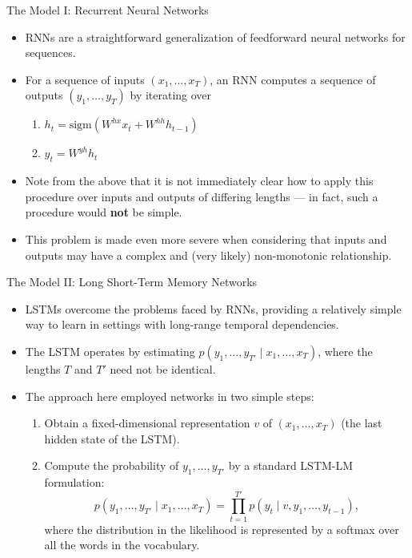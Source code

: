\documentclass{beamer}
\begin{document}

\begin{frame}{The Model I: Recurrent Neural Networks}

\begin{itemize}
  \itemsep10pt
  \item RNNs are a straightforward generalization of feedforward neural networks
    for sequences.
  \item For a sequence of inputs $(x_1, \dots, x_T)$, an RNN computes a sequence
    of outputs $(y_1, \dots, y_T)$ by iterating over
    \begin{enumerate}
      \item $h_t = \text{sigm}(W^{hx}x_t + W^{hh}h_{t-1})$
      \item $y_t = W^{yh}h_t$
    \end{enumerate}
  \item Note from the above that it is not immediately clear how to apply this
    procedure over inputs and outputs of differing lengths --- in fact, such a
    procedure would \textbf{not} be simple.
  \item This problem is made even more severe when considering that inputs and
    outputs may have a complex and (very likely) non-monotonic relationship.
\end{itemize}

\end{frame}


\begin{frame}{The Model II: Long Short-Term Memory Networks}

\begin{itemize}
  \itemsep10pt
  \item LSTMs overcome the problems faced by RNNs, providing a relatively simple
    way to learn in settings with long-range temporal dependencies.
  \item The LSTM operates by estimating $p(y_1, \dots, y_{T'} \mid x_1, \dots,
    x_T)$, where the lengths $T$ and $T'$ need not be identical.
  \item The approach here employed networks in two simple steps:
    \begin{enumerate}
      \item Obtain a fixed-dimensional representation $v$ of $(x_1, \dots, x_T)$
        (the last hidden state of the LSTM).
      \item Compute the probability of $y_1, \dots, y_{T'}$ by a standard
        LSTM-LM formulation:
        $$
        p(y_1, \dots, y_{T'} \mid x_1, \dots, x_T) = \prod_{t = 1}^{T'} p(y_t
          \mid v, y_1, \dots, y_{t-1}),
        $$
        where the distribution in the likelihood is represented by a softmax
        over all the words in the vocabulary.
    \end{enumerate}
\end{itemize}

\end{frame}
\end{document}
